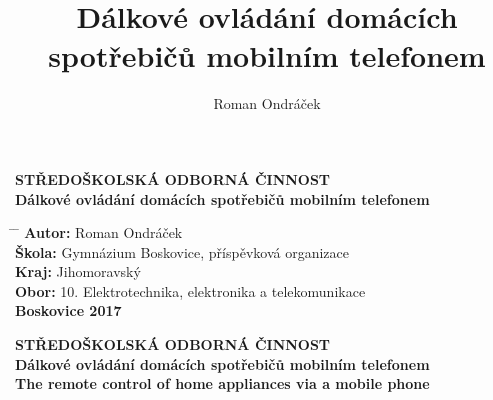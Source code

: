 \documentclass[12pt,a4paper,oneside]{article}
\author{Roman Ondráček}
\title{Dálkové ovládání domácích spotřebičů mobilním telefonem}
\begin{document}
\renewcommand{\baselinestretch}{1.5}
\pagestyle{empty}
\enlargethispage{60mm}
\begin{center}
\large \textbf{STŘEDOŠKOLSKÁ ODBORNÁ ČINNOST} \\

\vspace{32mm}
\huge \textbf{Dálkové ovládání domácích spotřebičů mobilním telefonem} \\

\vspace{64mm}
\end{center}

\begin{tabbing}
\hspace{4mm} \= \hspace{24mm}  \=   \kill
\> \large \textbf{Autor:}  \> \large{Roman Ondráček}                                    \\[4mm]
\> \large \textbf{Škola:}  \> \large{Gymnázium Boskovice, příspěvková organizace}       \\[4mm]
\> \large \textbf{Kraj:}   \> \large{Jihomoravský}                                      \\[4mm]
\> \large \textbf{Obor:}   \> \large{10. Elektrotechnika, elektronika a telekomunikace} \\[24mm]
\> \large \textbf{Boskovice 2017}
\end{tabbing}

\newpage

\renewcommand{\baselinestretch}{1.5}
\pagestyle{empty}
\enlargethispage{60mm}
\begin{center}
\large \textbf{STŘEDOŠKOLSKÁ ODBORNÁ ČINNOST} \\

\vspace{32mm}
\huge \textbf{Dálkové ovládání domácích spotřebičů mobilním telefonem} \\
\vspace{16mm}
\huge \textbf{The remote control of home appliances via a mobile phone} \\

\vspace{24mm}
\end{center}
\end{document}
